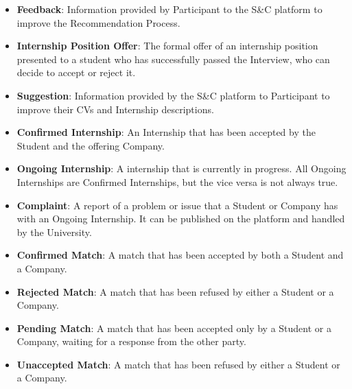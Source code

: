 \begin{itemize}
    \item \textcolor{titleColor}{\textbf{Feedback}\label{def:Feedback}}: Information provided by Participant to the S\&C platform to improve the Recommendation Process.
    \item \textcolor{titleColor}{\textbf{Internship Position Offer}\label{def:internshipPositionOffer}}: The formal offer of an internship position presented to a student who has successfully passed the Interview, who can decide to accept or reject it.
    \item \textcolor{titleColor}{\textbf{Suggestion}\label{def:suggestion}}: Information provided by the S\&C platform to Participant to improve their CVs and Internship descriptions.
    \item \textcolor{titleColor}{\textbf{Confirmed Internship}\label{def:confirmdInternship}}: An Internship that has been accepted by the Student and the offering Company.
    \item \textcolor{titleColor}{\textbf{Ongoing Internship}\label{def:ongoing}}: A internship that is currently in progress. All Ongoing Internships are Confirmed Internships, but the vice versa is not always true.
    \item \textcolor{titleColor}{\textbf{Complaint}\label{def:complaint}}: A report of a problem or issue that a Student or Company has with an Ongoing Internship. It can be published on the platform and handled by the University.
    \item \textcolor{titleColor}{\textbf{Confirmed Match}\label{def:confirmedMatch}}: A match that has been accepted by both a Student and a Company.
    \item \textcolor{titleColor}{\textbf{Rejected Match}\label{def:rejectedMatch}}: A match that has been refused by either a Student or a Company.
    \item \textcolor{titleColor}{\textbf{Pending Match}\label{def:pendingMatch}}: A match that has been accepted only by a Student or a Company, waiting for a response from the other party.
    \item \textcolor{titleColor}{\textbf{Unaccepted Match}\label{def:unacceptedMatch}}: A match that has been refused by either a Student or a Company.
\end{itemize}

